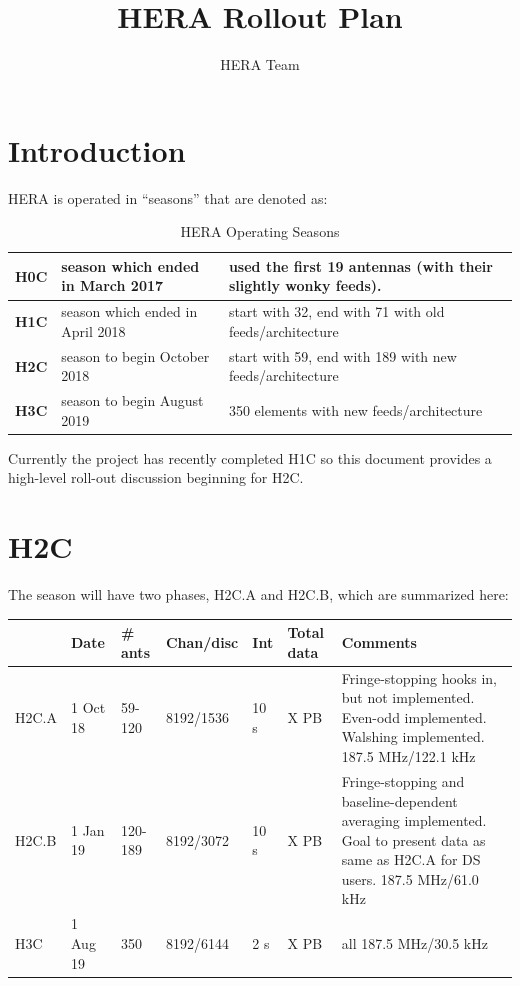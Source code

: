 \documentclass{article}
\begin{document}
\author{HERA Team}
\title{HERA Rollout Plan}
\maketitle

\setcounter{section}{-1}
\section{Introduction}
HERA is operated in ``seasons'' that are denoted as:

\begin{table}[H]
\caption{HERA Operating Seasons}
\begin{tabular}{p{0.5in} p{2.2in} p{3.5in}} \hline
{\bf H0C} & season which ended in March 2017 & used the first 19 antennas (with their slightly wonky feeds). \\ \hline
{\bf H1C} & season which ended in April 2018    & start with 32, end with 71 with old feeds/architecture\\ \hline
{\bf H2C} & season to begin October 2018         & start with 59, end with 189 with new feeds/architecture\\ \hline
{\bf H3C} & season to begin August 2019           & 350 elements with new feeds/architecture \\ \hline
\end{tabular}
\end{table}

Currently the project has recently completed H1C so this document provides a high-level roll-out discussion beginning for H2C.


\section{H2C}
The season will have two phases, H2C.A and H2C.B, which are summarized here:

\vspace{0.5cm}
\begin{tabular}{l l l l l l p{2.2in}}
 & \textbf{Date} & \textbf{\# ants} & \textbf{Chan/disc} & \textbf{Int} & \textbf{Total data} & \textbf{Comments} \\ \hline
H2C.A & 1 Oct 18 &  59-120   & 8192/1536 & 10 s&  X PB& Fringe-stopping hooks in, but not implemented.  Even-odd implemented. Walshing implemented. 187.5 MHz/122.1 kHz\\ \hline
H2C.B & 1 Jan 19 & 120-189 & 8192/3072 & 10 s& X PB & Fringe-stopping and baseline-dependent averaging implemented.  Goal to present data as same as H2C.A for DS users. 187.5 MHz/61.0 kHz\\ \hline
H3C    & 1 Aug 19 &  350       & 8192/6144 & 2  s&  X PB & all 187.5 MHz/30.5 kHz\\ \hline
\end{tabular}
\vspace{1cm}
\end{document}
